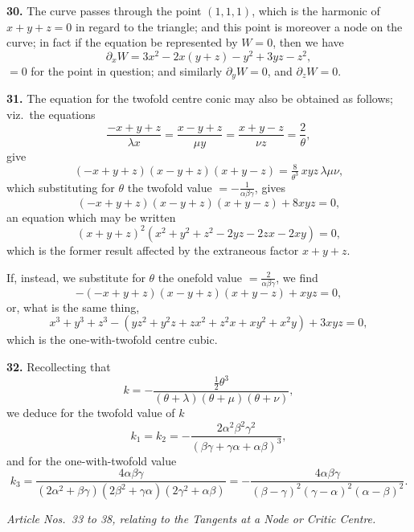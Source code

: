 \documentclass[11pt,a4paper]{article}
\begin{document}
\medskip

\textbf{30.} The curve passes through the point $(1, 1, 1)$, which is the harmonic of $x + y + z = 0$ in regard to the triangle; and this point is moreover a node on the curve; in fact if the equation be represented by $W = 0$, then we have
\[
\partial_x W = 3x^2 - 2x(y + z) - y^2 + 3yz - z^2,
\]
$= 0$ for the point in question; and similarly $\partial_y W = 0$, and $\partial_z W = 0$.

\medskip

\textbf{31.} The equation for the twofold centre conic may also be obtained as follows; viz.\ the equations
\[
\frac{-x + y + z}{\lambda x} = \frac{x - y + z}{\mu y} = \frac{x + y - z}{\nu z} = \frac{2}{\theta},
\]
give
\[
(-x + y + z)(x - y + z)(x + y - z) = \tfrac{8}{\theta^3}\,xyz\,\lambda\mu\nu,
\]
which substituting for $\theta$ the twofold value $= -\tfrac{1}{\alpha\beta\gamma}$, gives
\[
(-x + y + z)(x - y + z)(x + y - z) + 8xyz = 0,
\]
an equation which may be written
\[
(x + y + z)^2(x^2 + y^2 + z^2 - 2yz - 2zx - 2xy) = 0,
\]
which is the former result affected by the extraneous factor $x + y + z$.

If, instead, we substitute for $\theta$ the onefold value $= \tfrac{2}{\alpha\beta\gamma}$, we find
\[
-(-x + y + z)(x - y + z)(x + y - z) + xyz = 0,
\]
or, what is the same thing,
\[
x^3 + y^3 + z^3 - (yz^2 + y^2 z + zx^2 + z^2 x + xy^2 + x^2 y) + 3xyz = 0,
\]
which is the one-with-twofold centre cubic.

\medskip

\textbf{32.} Recollecting that
\[
k = -\frac{\tfrac{1}{2}\theta^3}{(\theta + \lambda)(\theta + \mu)(\theta + \nu)},
\]
we deduce for the twofold value of $k$
\[
k_1 = k_2 = -\frac{2\alpha^2\beta^2\gamma^2}{(\beta\gamma + \gamma\alpha + \alpha\beta)^3},
\]
and for the one-with-twofold value
\[
k_3 = \frac{4\alpha\beta\gamma}{(2\alpha^2 + \beta\gamma)(2\beta^2 + \gamma\alpha)(2\gamma^2 + \alpha\beta)} = -\frac{4\alpha\beta\gamma}{(\beta - \gamma)^2(\gamma - \alpha)^2(\alpha - \beta)^2}.
\]

\begin{center}
\textit{Article Nos.~33 to 38, relating to the Tangents at a Node or Critic Centre.}
\end{center}
\end{document}
